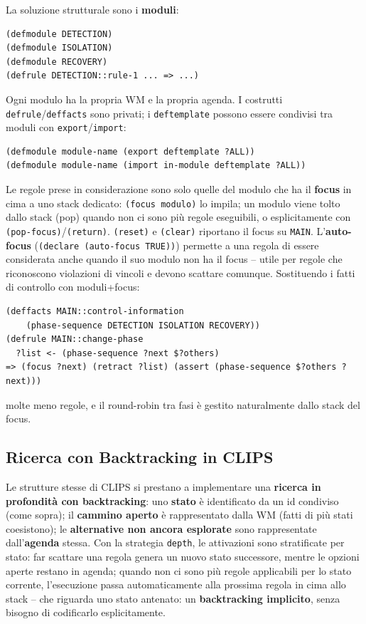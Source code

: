 \documentclass[a4paper,11pt]{article}
\begin{document}
La soluzione strutturale sono i \textbf{moduli}:
\begin{lstlisting}
(defmodule DETECTION)
(defmodule ISOLATION)
(defmodule RECOVERY)
(defrule DETECTION::rule-1 ... => ...)
\end{lstlisting}
Ogni modulo ha la propria WM e la propria agenda. I costrutti \texttt{defrule}/\texttt{deffacts} sono privati; i \texttt{deftemplate} possono essere condivisi tra moduli con \texttt{export}/\texttt{import}:
\begin{lstlisting}
(defmodule module-name (export deftemplate ?ALL))
(defmodule module-name (import in-module deftemplate ?ALL))
\end{lstlisting}
Le regole prese in considerazione sono solo quelle del modulo che ha il \textbf{focus} in cima a uno stack dedicato: \texttt{(focus modulo)} lo impila; un modulo viene tolto dallo stack (pop) quando non ci sono più regole eseguibili, o esplicitamente con \texttt{(pop-focus)}/\texttt{(return)}. \texttt{(reset)} e \texttt{(clear)} riportano il focus su \texttt{MAIN}. L'\textbf{auto-focus} (\texttt{(declare (auto-focus TRUE))}) permette a una regola di essere considerata anche quando il suo modulo non ha il focus -- utile per regole che riconoscono violazioni di vincoli e devono scattare comunque. Sostituendo i fatti di controllo con moduli+focus:
\begin{lstlisting}
(deffacts MAIN::control-information
    (phase-sequence DETECTION ISOLATION RECOVERY))
(defrule MAIN::change-phase
  ?list <- (phase-sequence ?next $?others)
=> (focus ?next) (retract ?list) (assert (phase-sequence $?others ?next)))
\end{lstlisting}
molte meno regole, e il round-robin tra fasi è gestito naturalmente dallo stack del focus.

\subsection{Ricerca con Backtracking in CLIPS}

Le strutture stesse di CLIPS si prestano a implementare una \textbf{ricerca in profondità con backtracking}: uno \textbf{stato} è identificato da un id condiviso (come sopra); il \textbf{cammino aperto} è rappresentato dalla WM (fatti di più stati coesistono); le \textbf{alternative non ancora esplorate} sono rappresentate dall'\textbf{agenda} stessa. Con la strategia \texttt{depth}, le attivazioni sono stratificate per stato: far scattare una regola genera un nuovo stato successore, mentre le opzioni aperte restano in agenda; quando non ci sono più regole applicabili per lo stato corrente, l'esecuzione passa automaticamente alla prossima regola in cima allo stack -- che riguarda uno stato antenato: un \textbf{backtracking implicito}, senza bisogno di codificarlo esplicitamente.
\end{document}
